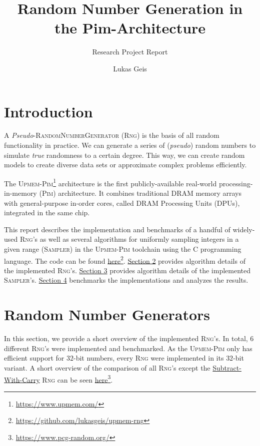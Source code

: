 \documentclass[a4paper]{scrartcl}
\title{Random Number Generation in the Pim-Architecture}
\subtitle{Research Project Report}
\author{Lukas Geis}
\date{}
\begin{document}
\maketitle
\tableofcontents

\newpage
\section{Introduction} \label{sec:1}
A \emph{Pseudo}-\textsc{RandomNumberGenerator} (\textsc{Rng}) is the basis of all random functionality in practice.
We can generate a series of (\emph{pseudo}) random numbers to simulate \emph{true} randomness to a certain degree.
This way, we can create random models to create diverse data sets or approximate complex problems efficiently.

The \textsc{Upmem-Pim}\footnote{\url{https://www.upmem.com/}} architecture is the first publicly-available real-world processing-in-memory (\textsc{Pim}) architecture.
It combines traditional DRAM memory arrays with general-purpose in-order cores, called DRAM Processing Units (DPUs), integrated in the same chip.

This report describes the implementation and benchmarks of a handful of widely-used \textsc{Rng}'s as well as several algorithms for uniformly sampling integers in a given range (\textsc{Sampler}) in the \textsc{Upmem-Pim} toolchain using the C programming language.
The code can be found \href{https://github.com/lukasgeis/upmem-rng}{here}\footnote{\url{https://github.com/lukasgeis/upmem-rng}}.
\hyperref[sec:2]{Section 2} provides algorithm details of the implemented \textsc{Rng}'s.
\hyperref[sec:3]{Section 3} provides algorithm details of the implemented \textsc{Sampler}'s.
\hyperref[sec:4]{Section 4} benchmarks the implementations and analyzes the results.


\section{Random Number Generators} \label{sec:2}
In this section, we provide a short overview of the implemented \textsc{Rng}'s.
In total, $6$ different \textsc{Rng}'s were implemented and benchmarked.
As the \textsc{Upmem-Pim} only has efficient support for $32$-bit numbers, every \textsc{Rng} were implemented in its $32$-bit variant.
A short overview of the comparison of all \textsc{Rng}'s except the \hyperref[sec:2.3]{Subtract-With-Carry} \textsc{Rng} can be seen \href{https://www.pcg-random.org/}{here}\footnote{\url{https://www.pcg-random.org/}}.
\end{document}
